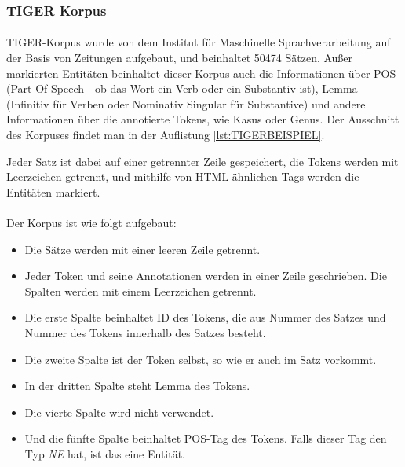 \subsubsection{TIGER Korpus}
\paragraph{}
TIGER-Korpus wurde von dem Institut für Maschinelle Sprachverarbeitung\cite{brants2004tiger} auf der Basis von Zeitungen aufgebaut, und beinhaltet 50474 Sätzen. Außer markierten Entitäten beinhaltet dieser Korpus auch die Informationen über POS (Part Of Speech - ob das Wort ein Verb oder ein Substantiv ist), Lemma (Infinitiv für Verben oder Nominativ Singular für Substantive) und andere Informationen über die annotierte Tokens, wie Kasus oder Genus. Der Ausschnitt des Korpuses findet man in der Auflistung \ref{lst:TIGERBEISPIEL}.


Jeder Satz ist dabei auf einer getrennter Zeile gespeichert, die Tokens werden mit Leerzeichen getrennt, und mithilfe von HTML-ähnlichen Tags werden die Entitäten markiert.

\paragraph{}
Der Korpus ist wie folgt aufgebaut:
\begin{itemize}
\item Die Sätze werden mit einer leeren Zeile getrennt.
\item Jeder Token und seine Annotationen werden in einer Zeile geschrieben. Die Spalten werden mit einem Leerzeichen getrennt.
\item Die erste Spalte beinhaltet ID des Tokens, die aus Nummer des Satzes und Nummer des Tokens innerhalb des Satzes besteht.
\item Die zweite Spalte ist der Token selbst, so wie er auch im Satz vorkommt.
\item In der dritten Spalte steht Lemma des Tokens.
\item Die vierte Spalte wird nicht verwendet.
\item Und die fünfte Spalte beinhaltet POS-Tag des Tokens. Falls dieser Tag den Typ \textit{NE} hat, ist das eine Entität.
\end{itemize}

